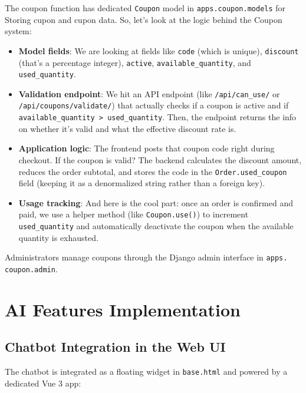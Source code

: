 The coupon function has dedicated \texttt{Coupon} model in \texttt{apps.coupon.models} for Storing cupon and cupon data. So, let's look at the logic behind the Coupon system:

\begin{itemize}
  \item \textbf{Model fields}: We are looking at fields like \texttt{code} (which is unique), \texttt{discount} (that's a percentage integer), \texttt{active}, \texttt{available\_quantity}, and \texttt{used\_quantity}.
  \item \textbf{Validation endpoint}: We hit an API endpoint (like \texttt{/api/can\_use/} or \texttt{/api/coupons/validate/}) that actually checks if a coupon is active and if \texttt{available\_quantity > used\_quantity}. Then, the endpoint returns the info on whether it's valid and what the effective discount rate is.
  \item \textbf{Application logic}: The frontend posts that coupon code right during checkout. If the coupon is valid? The backend calculates the discount amount, reduces the order subtotal, and stores the code in the \texttt{Order.used\_coupon} field (keeping it as a denormalized string rather than a foreign key).
  \item \textbf{Usage tracking}: And here is the cool part: once an order is confirmed and paid, we use a helper method (like \texttt{Coupon.use()}) to increment \texttt{used\_quantity} and automatically deactivate the coupon when the available quantity is exhausted.
\end{itemize}
Administrators manage coupons through the Django admin interface in \texttt{apps.\\coupon.admin}.

\section{AI Features Implementation}

\subsection{Chatbot Integration in the Web UI}

The chatbot is integrated as a floating widget in \texttt{base.html} and powered by a dedicated Vue 3 app:

